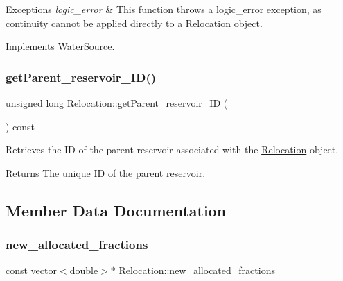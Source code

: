 \begin{DoxyExceptions}{Exceptions}
{\em logic\+\_\+error} & This function throws a {\ttfamily logic\+\_\+error} exception, as continuity cannot be applied directly to a \mbox{\hyperlink{classRelocation}{Relocation}} object. \\
\hline
\end{DoxyExceptions}


Implements \mbox{\hyperlink{classWaterSource_ac070445379fe706f65b977dade4f3fbc}{Water\+Source}}.

\mbox{\label{classRelocation_ae04b94d64c0ffd9a14dcdafdea551988}} 
\subsubsection{\texorpdfstring{get\+Parent\+\_\+reservoir\+\_\+\+I\+D()}{getParent\_reservoir\_ID()}}
{\footnotesize\ttfamily unsigned long Relocation\+::get\+Parent\+\_\+reservoir\+\_\+\+ID (\begin{DoxyParamCaption}{ }\end{DoxyParamCaption}) const}



Retrieves the ID of the parent reservoir associated with the \mbox{\hyperlink{classRelocation}{Relocation}} object. 

\begin{DoxyReturn}{Returns}
The unique ID of the parent reservoir. 
\end{DoxyReturn}


\subsection{Member Data Documentation}
\mbox{\label{classRelocation_acc95d1be560fed2b4a1b4b2ae605ae67}} 
\subsubsection{\texorpdfstring{new\+\_\+allocated\+\_\+fractions}{new\_allocated\_fractions}}
{\footnotesize\ttfamily const vector$<$double$>$$\ast$ Relocation\+::new\+\_\+allocated\+\_\+fractions}



